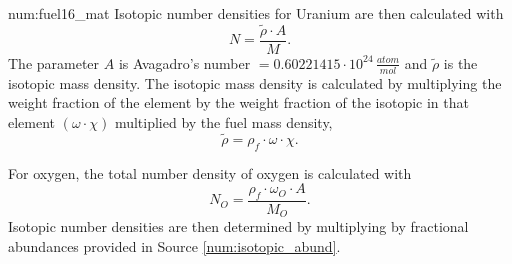 \begin{numitem}{num:fuel16_mat}
Isotopic number densities for Uranium are then calculated with
\[
    N = \frac{\widetilde{\rho} \cdot A}{M}.
\]
The parameter $A$ is Avagadro's number $=0.60221415\cdot 10^{24}\,\frac{atom}{mol}$ and $\widetilde{\rho}$ is the isotopic mass density. The isotopic mass density is calculated by multiplying the weight fraction of the element by the weight fraction of the isotopic in that element $\left(\omega\cdot\chi\right)$ multiplied by the fuel mass density,
\[
  \widetilde{\rho} = \rho_f\cdot \omega \cdot \chi.
\]

For oxygen, the total number density of oxygen is calculated with
\[
    N_O = \frac{\rho_f \cdot \omega_O \cdot A}{M_O}.
\]
Isotopic number densities are then determined by multiplying by fractional abundances provided in Source \ref{num:isotopic_abund}.


\end{numitem}

